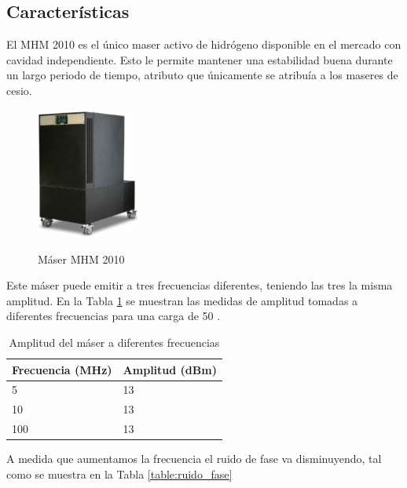 \subsection{Caracter\'isticas}
El MHM 2010 es el único maser activo de hidrógeno disponible en el mercado con cavidad independiente. Esto le permite mantener una estabilidad buena durante un largo periodo de tiempo, atributo que únicamente se atribuía a los maseres de cesio.


\begin{figure}[htb!!]
 \centering
 \includegraphics[width=0.3\textwidth]{./Utils/maser_MHM.png}
 \label{fig:imagen_maser}
 \caption{M\'aser MHM 2010}
\end{figure}

Este m\'aser puede emitir a tres frecuencias diferentes, teniendo las tres la misma amplitud. En la Tabla \ref{table:amplitud} se muestran las medidas de amplitud tomadas a diferentes frecuencias para una carga de 50 \ohm.

\begin{table}[htb]
\begin{center}
\begin{tabular}[t]{|l|l|}
\hline \hline
\rowcolor[RGB]{244, 184, 184} \textbf{Frecuencia (MHz)} & \textbf{Amplitud (dBm)}\\
\hline \hline
5 & 13\\
\hline
10 & 13\\
\hline
100 & 13\\
\hline\hline
\end{tabular}
\end{center}
\caption{Amplitud del m\'aser a diferentes frecuencias}
\label{table:amplitud}
\end{table}

A medida que aumentamos la frecuencia el ruido de fase va disminuyendo, tal como se muestra en la Tabla \ref{table:ruido_fase}

